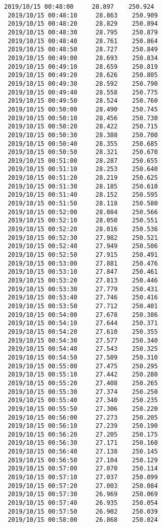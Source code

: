 \documentclass[11pt]{article}
\begin{document}
\begin{Verbatim}[commandchars=\\\{\}]
 2019/10/15 00:48:00     28.897    250.924
 2019/10/15 00:48:10     28.863    250.909
 2019/10/15 00:48:20     28.829    250.894
 2019/10/15 00:48:30     28.795    250.879
 2019/10/15 00:48:40     28.761    250.864
 2019/10/15 00:48:50     28.727    250.849
 2019/10/15 00:49:00     28.693    250.834
 2019/10/15 00:49:10     28.659    250.819
 2019/10/15 00:49:20     28.626    250.805
 2019/10/15 00:49:30     28.592    250.790
 2019/10/15 00:49:40     28.558    250.775
 2019/10/15 00:49:50     28.524    250.760
 2019/10/15 00:50:00     28.490    250.745
 2019/10/15 00:50:10     28.456    250.730
 2019/10/15 00:50:20     28.422    250.715
 2019/10/15 00:50:30     28.388    250.700
 2019/10/15 00:50:40     28.355    250.685
 2019/10/15 00:50:50     28.321    250.670
 2019/10/15 00:51:00     28.287    250.655
 2019/10/15 00:51:10     28.253    250.640
 2019/10/15 00:51:20     28.219    250.625
 2019/10/15 00:51:30     28.185    250.610
 2019/10/15 00:51:40     28.152    250.595
 2019/10/15 00:51:50     28.118    250.580
 2019/10/15 00:52:00     28.084    250.566
 2019/10/15 00:52:10     28.050    250.551
 2019/10/15 00:52:20     28.016    250.536
 2019/10/15 00:52:30     27.982    250.521
 2019/10/15 00:52:40     27.949    250.506
 2019/10/15 00:52:50     27.915    250.491
 2019/10/15 00:53:00     27.881    250.476
 2019/10/15 00:53:10     27.847    250.461
 2019/10/15 00:53:20     27.813    250.446
 2019/10/15 00:53:30     27.779    250.431
 2019/10/15 00:53:40     27.746    250.416
 2019/10/15 00:53:50     27.712    250.401
 2019/10/15 00:54:00     27.678    250.386
 2019/10/15 00:54:10     27.644    250.371
 2019/10/15 00:54:20     27.610    250.355
 2019/10/15 00:54:30     27.577    250.340
 2019/10/15 00:54:40     27.543    250.325
 2019/10/15 00:54:50     27.509    250.310
 2019/10/15 00:55:00     27.475    250.295
 2019/10/15 00:55:10     27.442    250.280
 2019/10/15 00:55:20     27.408    250.265
 2019/10/15 00:55:30     27.374    250.250
 2019/10/15 00:55:40     27.340    250.235
 2019/10/15 00:55:50     27.306    250.220
 2019/10/15 00:56:00     27.273    250.205
 2019/10/15 00:56:10     27.239    250.190
 2019/10/15 00:56:20     27.205    250.175
 2019/10/15 00:56:30     27.171    250.160
 2019/10/15 00:56:40     27.138    250.145
 2019/10/15 00:56:50     27.104    250.129
 2019/10/15 00:57:00     27.070    250.114
 2019/10/15 00:57:10     27.037    250.099
 2019/10/15 00:57:20     27.003    250.084
 2019/10/15 00:57:30     26.969    250.069
 2019/10/15 00:57:40     26.935    250.054
 2019/10/15 00:57:50     26.902    250.039
 2019/10/15 00:58:00     26.868    250.024

\end{Verbatim}
\end{document}
